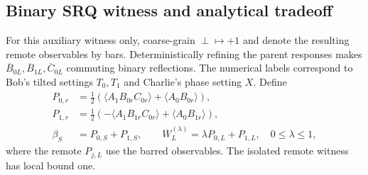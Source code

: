 \documentclass[aps,10pt,onecolumn,prx,superscriptaddress,longbibliography,nofootinbib]{revtex4-2}
\newcommand{\perpout}{\perp}
\begin{document}
\subsection{Binary SRQ witness and analytical tradeoff}

For this auxiliary witness only, coarse-grain \(\perpout\mapsto+1\) and denote the resulting remote observables by bars. Deterministically refining the parent responses makes \(\overline B_{0L},\overline B_{1L},\overline C_{0L}\) commuting binary reflections. The numerical labels correspond to Bob's tilted settings \(T_0,T_1\) and Charlie's phase setting \(X\). Define
\begin{align}
 P_{0,r}&=\tfrac12(\langle A_1B_{0r}C_{0r}\rangle+\langle A_0B_{0r}\rangle),\nonumber\\
 P_{1,r}&=\tfrac12(-\langle A_1B_{1r}C_{0r}\rangle+\langle A_0B_{1r}\rangle),\nonumber\\
 \beta_S&=P_{0,S}+P_{1,S},\qquad \overline W_L^{(\lambda)}=\lambda P_{0,L}+P_{1,L},\quad0\leq\lambda\leq1,
 \label{eq:si-lambda-definitions}
\end{align}
where the remote \(P_{j,L}\) use the barred observables. The isolated remote witness has local bound one.
\end{document}
